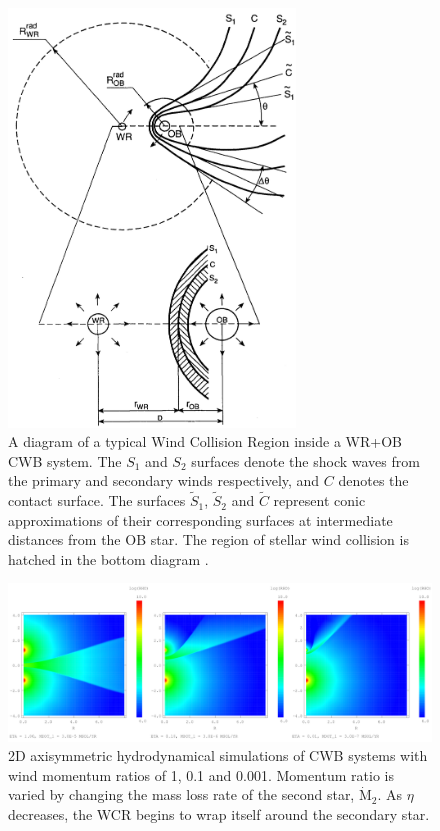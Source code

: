 \begin{figure}
  \centering
  \includegraphics[width=3in]{assets/cwb-diagrams/eichler.png}
  \caption[\textit{A diagram of the Wind Collision Region \parencite{eichler_particle_1993}}]{A diagram of a typical Wind Collision Region inside a WR+OB CWB system. The $S_1$ and $S_2$ surfaces denote the shock waves from the primary and secondary winds respectively, and $C$ denotes the contact surface. The surfaces $\widetilde{S}_1$, $\widetilde{S}_2$ and $\widetilde{C}$ represent conic approximations of their corresponding surfaces at intermediate distances from the OB star. The region of stellar wind collision is hatched in the bottom diagram \parencite{eichler_particle_1993}.}
  \label{fig:wcr-diagram}
\end{figure}

\begin{figure}
  \centering
  \includegraphics[width=6in]{assets/cwb-diagrams/eta.png}
  \caption[Comparison of wind momentum ratio, $\eta$, on WCR strtucture]{2D axisymmetric hydrodynamical simulations of CWB systems with wind momentum ratios of \num{1}, \num{0.1} and \num{0.001}. Momentum ratio is varied by changing the mass loss rate of the second star, $\dot{\text{M}}_2$. As $\eta$ decreases, the WCR begins to wrap itself around the secondary star.}
  \label{fig:wcr-eta}
\end{figure}

